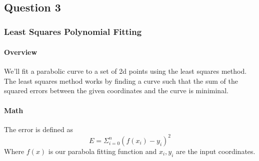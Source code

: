 \documentclass[11pt]{article}
\begin{document}
    \begin{center}
    \end{center}
    { \hspace*{\fill} \\}
    
    \begin{center}
    \end{center}
    { \hspace*{\fill} \\}
    
    \begin{center}
    \end{center}
    { \hspace*{\fill} \\}
    
    \hypertarget{question-3}{%
\subsection{Question 3}\label{question-3}}

    \hypertarget{least-squares-polynomial-fitting}{%
\subsubsection{Least Squares Polynomial
Fitting}\label{least-squares-polynomial-fitting}}

    \hypertarget{overview}{%
\paragraph{Overview}\label{overview}}

    We'll fit a parabolic curve to a set of 2d points using the least
squares method. The least squares method works by finding a curve such
that the sum of the squared errors between the given coordinates and the
curve is miniminal.

    \hypertarget{math}{%
\paragraph{Math}\label{math}}

    The error is defined as \[ E = \Sigma_{i=0}^n (f(x_i) - y_i)^2 \] Where
\(f(x)\) is our parabola fitting function and \(x_i, y_i\) are the input
coordinates.
\end{document}
